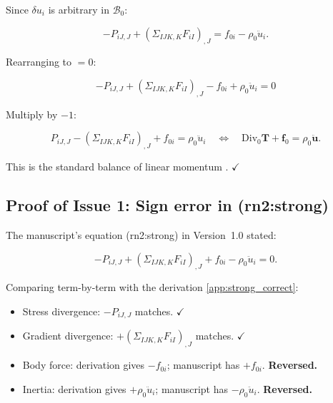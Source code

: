 \documentclass[11pt]{article}
\begin{document}
Since $\delta u_i$ is arbitrary in $\mathcal{B}_0$:

\begin{equation}
-P_{iJ,J}+(\Sigma_{IJK,K}F_{iI})_{,J} = f_{0i}-\rho_0\ddot{u}_i.
\end{equation}

Rearranging to $=0$:

\begin{equation}
\boxed{-P_{iJ,J}+(\Sigma_{IJK,K}F_{iI})_{,J}-f_{0i}+\rho_0\ddot{u}_i=0}
\label{app:strong_correct}
\end{equation}

Multiply by $-1$:

\begin{equation}
P_{iJ,J}-(\Sigma_{IJK,K}F_{iI})_{,J}+f_{0i} = \rho_0\ddot{u}_i
\quad\Longleftrightarrow\quad
\mathrm{Div}_0\mathbf{T}+\mathbf{f}_0=\rho_0\ddot{\mathbf{u}}.
\label{app:balance}
\end{equation}

This is the standard balance of linear momentum \cite{Holzapfel2000,BonetWood2008,SimoHughes1998}. $\checkmark$

\subsection{Proof of Issue 1: Sign error in (rn2:strong)}
\label{app:proof1}

The manuscript's equation (rn2:strong) in Version~1.0 stated:

\begin{equation}
-P_{iJ,J}+(\Sigma_{IJK,K}F_{iI})_{,J}+f_{0i}-\rho_0\ddot{u}_i=0.
\label{app:manuscript_strong}
\end{equation}

Comparing term-by-term with the derivation \eqref{app:strong_correct}:

\begin{itemize}
\item Stress divergence: $-P_{iJ,J}$ matches. $\checkmark$
\item Gradient divergence: $+(\Sigma_{IJK,K}F_{iI})_{,J}$ matches. $\checkmark$
\item Body force: derivation gives $-f_{0i}$; manuscript has $+f_{0i}$. \textbf{Reversed.}
\item Inertia: derivation gives $+\rho_0\ddot{u}_i$; manuscript has $-\rho_0\ddot{u}_i$. \textbf{Reversed.}
\end{itemize}
\end{document}
